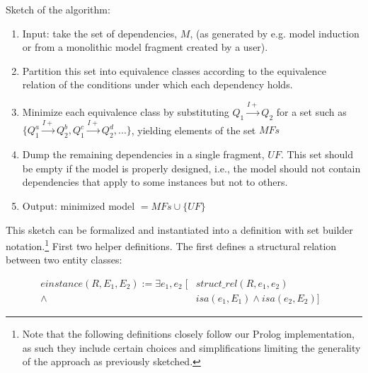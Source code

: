 \documentclass{article} %
\begin{document}
%
%

Sketch of the algorithm:

\begin{enumerate}

\item Input: take the set of dependencies, $M$, (as generated by e.g. model
	induction or from a monolithic model fragment created by a user).  

\item Partition this set into equivalence classes according to the
	equivalence relation of the conditions under which each dependency
	holds.

\item Minimize each equivalence class by substituting 
	$Q_1 \overset{I+}{\rightarrow} Q_2 $ for a set such as 
	$ \{ Q_1^a \overset{I+}{\rightarrow} Q_2^b, Q_1^c \overset{I+}{\rightarrow} Q_2^d,  . . . \} $, 
	yielding elements of the set $MFs$

\item Dump the remaining dependencies in a single fragment, $UF$. 
	This set should be empty if the model is properly designed, i.e., the
	model should not contain dependencies that apply to some instances but
	not to others.

\item Output: minimized model $ = MFs \cup \{ UF \} $

\end{enumerate}

This sketch can be formalized and instantiated into a definition with set
builder notation.\footnote{Note that the following definitions closely follow
our Prolog implementation, as such they include certain choices and
simplifications limiting the generality of the approach as previously
sketched.}  First two helper definitions. The first defines a structural
relation between two entity classes:

\begin{align*}
einstance(R, E_1, E_2) :=
	\exists e_1, e_2 \; [ &struct\_rel(R, e_1, e_2) & \\
	\land \; &isa(e_1, E_1) \land isa(e_2, E_2) ]
\end{align*}
\end{document}

